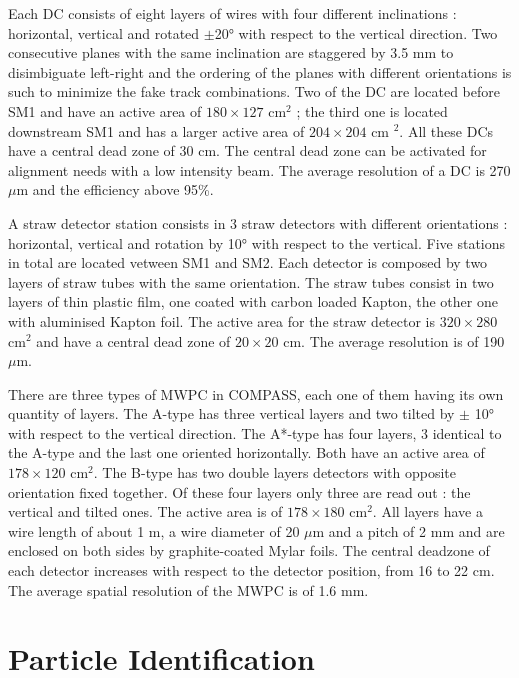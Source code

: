 Each DC consists of eight layers of wires with four different inclinations : horizontal, vertical and rotated $\pm$20° with respect
to the vertical direction. Two consecutive planes with the same inclination are staggered by 3.5 mm to disimbiguate left-right and
the ordering of the planes with different orientations is such to minimize the fake track combinations. Two of the DC are located before
SM1 and have an active area of $180 \times 127$ cm$^2$ ; the third one is located downstream SM1 and has a larger active area of $204 \times 204$ cm $^2$.
All these DCs have a central dead zone of 30 cm. The central dead zone can be activated for alignment needs with a low intensity beam.
The average resolution of a DC is 270 $\mu$m and the efficiency above 95\%.

A straw detector station consists in 3 straw detectors with different orientations : horizontal, vertical and rotation by 10° with respect
to the vertical. Five stations in total are located vetween SM1 and SM2. Each detector is composed by two layers of straw tubes with the
same orientation. The straw tubes consist in two layers of thin plastic film, one coated with carbon loaded Kapton, the other one with
aluminised Kapton foil. The active area for the straw detector is $320 \times 280$ cm$^2$ and have a central dead zone of $20 \times 20$ cm.
The average resolution is of 190 $\mu$m.

There are three types of MWPC in COMPASS, each one of them having its own quantity of layers. The A-type has three vertical layers and two tilted
by $\pm$ 10° with respect to the vertical direction. The A*-type has four layers, 3 identical to the A-type and the last one oriented horizontally.
Both have an active area of $178 \times 120$ cm$^2$. The B-type has two double layers detectors with opposite orientation fixed together. Of these
four layers only three are read out : the vertical and tilted ones. The active area is of $178 \times 180$ cm$^2$. All layers have a wire length of
about 1 m, a wire diameter of 20 $\mu$m and a pitch of 2 mm and are enclosed on both sides by graphite-coated Mylar foils. The central deadzone of each
detector increases with respect to the detector position, from 16 to 22 cm. The average spatial resolution of the MWPC is of 1.6 mm.


\section{Particle Identification}

